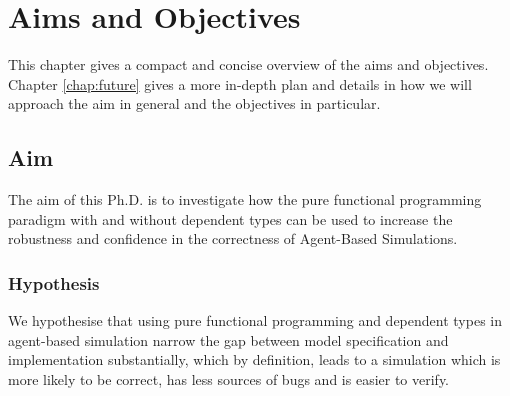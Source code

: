 \chapter{Aims and Objectives}
\label{chap:aimsObj}

This chapter gives a compact and concise overview of the aims and objectives. Chapter \ref{chap:future} gives a more in-depth plan and details in how we will approach the aim in general and the objectives in particular.

\section{Aim}
The aim of this Ph.D. is to investigate how the pure functional programming paradigm with and without dependent types can be used to increase the robustness and confidence in the correctness of Agent-Based Simulations.

\subsection{Hypothesis}
We hypothesise that using pure functional programming and dependent types in agent-based simulation narrow the gap between model specification and implementation substantially, which by definition, leads to a simulation which is more likely to be correct, has less sources of bugs and is easier to verify. %

